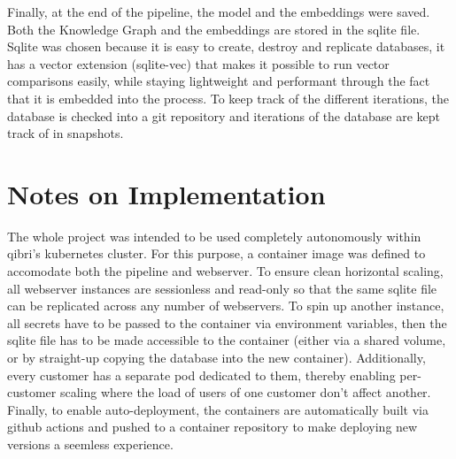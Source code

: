 \documentclass[draft,final]{vutinfth} %
\begin{document}
Finally, at the end of the pipeline, the model and the embeddings were saved. Both the Knowledge Graph and the embeddings are stored in the sqlite file. Sqlite was chosen because it is easy to create, destroy and replicate databases, it has a vector extension (sqlite-vec) that makes it possible to run vector comparisons easily, while staying lightweight and performant through the fact that it is embedded into the process. To keep track of the different iterations, the database is checked into a git repository and iterations of the database are kept track of in snapshots.


\section{Notes on Implementation}
The whole project was intended to be used completely autonomously within qibri's kubernetes cluster. For this purpose, a container image was defined to accomodate both the pipeline and webserver. To ensure clean horizontal scaling, all webserver instances are sessionless and read-only so that the same sqlite file can be replicated across any number of webservers. To spin up another instance, all secrets have to be passed to the container via environment variables, then the sqlite file has to be made accessible to the container (either via a shared volume, or by straight-up copying the database into the new container). Additionally, every customer has a separate pod dedicated to them, thereby enabling per-customer scaling where the load of users of one customer don't affect another. 
Finally, to enable auto-deployment, the containers are automatically built via github actions and pushed to a container repository to make deploying new versions a seemless experience.
\end{document}
